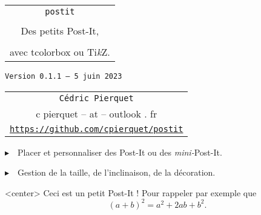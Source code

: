 \documentclass[french,a4paper,11pt]{article}
\def\TPversion{0.1.1}
\def\TPdate{5 juin 2023}
\begin{document}
\setlength{\aweboxleftmargin}{0.07\linewidth}
\setlength{\aweboxcontentwidth}{0.93\linewidth}
\setlength{\aweboxvskip}{8pt}

\pagestyle{fancy}

\thispagestyle{empty}

\vspace{2cm}

\begin{center}
	\begin{minipage}{0.75\linewidth}
	\begin{tcolorbox}[colframe=yellow,colback=yellow!15]
		\begin{center}
			\begin{tabular}{c}
				{\Huge \texttt{postit}}\\
				\\
				{\LARGE Des petits Post-It,} \\
				\\
				{\LARGE avec \textsf{tcolorbox} ou \textsf{Ti\textit{k}Z}.} \\
			\end{tabular}
			
			\bigskip
			
			{\small \texttt{Version \TPversion{} -- \TPdate}}
		\end{center}
	\end{tcolorbox}
\end{minipage}
\end{center}

\begin{center}
	\begin{tabular}{c}
	\texttt{Cédric Pierquet}\\
	{\ttfamily c pierquet -- at -- outlook . fr}\\
	\texttt{\url{https://github.com/cpierquet/postit}}
\end{tabular}
\end{center}

\vspace{0.25cm}

{$\blacktriangleright$~~Placer et personnaliser des Post-It ou des \textit{mini-}Post-It.}

\vspace{0.25cm}

{$\blacktriangleright$~~Gestion de la taille, de l'inclinaison, de la décoration.}

\vspace{1cm}

\begin{PostIt}<center>
	Ceci est un petit Post-It ! Pour rappeler par exemple que \[(a+b)^2=a^2+2ab+b^2.\]
\end{PostIt}
\end{document}
